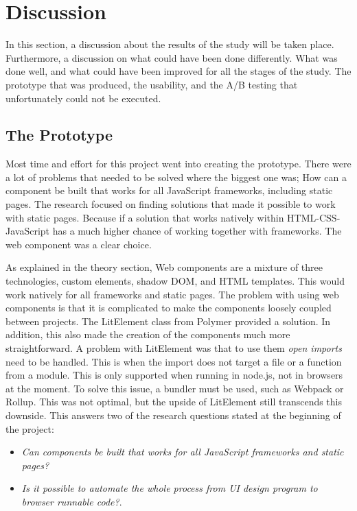 \section{Discussion}

In this section, a discussion about the results of the study will be taken place. Furthermore, a discussion on what could have been done differently. What was done well, and what could have been improved for all the stages of the study. The prototype that was produced, the usability, and the A/B testing that unfortunately could not be executed.


\subsection{The Prototype}%
\label{sub:The Prototype}
Most time and effort for this project went into creating the prototype. 
There were a lot of problems that needed to be solved where the biggest one was; How can a component be built that works for all JavaScript frameworks, including static pages. The research focused on finding solutions that made it possible to work with static pages. Because if a solution that works natively within HTML-CSS-JavaScript has a much higher chance of working together with frameworks. The web component was a clear choice.

As explained in the theory section, Web components are a mixture of three technologies, custom elements, shadow DOM, and HTML templates. This would work natively for all frameworks and static pages. The problem with using web components is that it is complicated to make the components loosely coupled between projects. The LitElement class from Polymer provided a solution. In addition, this also made the creation of the components much more straightforward. A problem with LitElement was that to use them \textit{open imports} need to be handled. This is when the import does not target a file or a function from a module. This is only supported when running in node.js, not in browsers at the moment. To solve this issue, a bundler must be used, such as Webpack or Rollup. This was not optimal, but the upside of LitElement still transcends this downside. This answers two of the research questions stated at the beginning of the project:
\begin{itemize}
  \item \textit{Can components be built that works for all JavaScript frameworks and static pages?} 
  \item \textit{Is it possible to automate the whole process from UI design program to browser runnable code?}.
\end{itemize}


